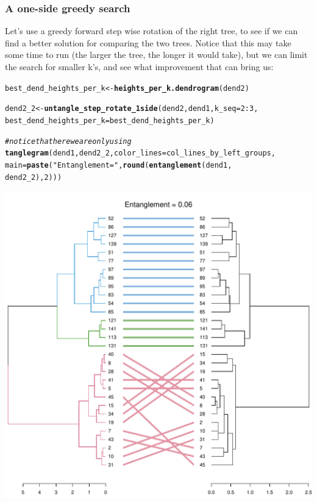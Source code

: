 \documentclass[shortnames,nojss,article]{jss}\usepackage[]{graphicx}\usepackage[]{color}
\makeatletter
\def\maxwidth{ %
  \ifdim\Gin@nat@width>\linewidth
    \linewidth
  \else
    \Gin@nat@width
  \fi
}
\newcommand{\hlnum}[1]{\textcolor[rgb]{0.686,0.059,0.569}{#1}}%
\newcommand{\hlstr}[1]{\textcolor[rgb]{0.192,0.494,0.8}{#1}}%
\newcommand{\hlcom}[1]{\textcolor[rgb]{0.678,0.584,0.686}{\textit{#1}}}%
\newcommand{\hlopt}[1]{\textcolor[rgb]{0,0,0}{#1}}%
\newcommand{\hlstd}[1]{\textcolor[rgb]{0.345,0.345,0.345}{#1}}%
\newcommand{\hlkwb}[1]{\textcolor[rgb]{0.69,0.353,0.396}{#1}}%
\newcommand{\hlkwc}[1]{\textcolor[rgb]{0.333,0.667,0.333}{#1}}%
\newcommand{\hlkwd}[1]{\textcolor[rgb]{0.737,0.353,0.396}{\textbf{#1}}}%
\newenvironment{kframe}{%
 \def\at@end@of@kframe{}%
 \ifinner\ifhmode%
  \def\at@end@of@kframe{\end{minipage}}%
  \begin{minipage}{\columnwidth}%
 \fi\fi%
 \def\FrameCommand##1{\hskip\@totalleftmargin \hskip-\fboxsep
 \colorbox{shadecolor}{##1}\hskip-\fboxsep
     \hskip-\linewidth \hskip-\@totalleftmargin \hskip\columnwidth}%
 \MakeFramed {\advance\hsize-\width
   \@totalleftmargin\z@ \linewidth\hsize
   \@setminipage}}%
 {\par\unskip\endMakeFramed%
 \at@end@of@kframe}
\newenvironment{knitrout}{}{} %
\makeatother
\begin{document}
\subsubsection{A one-side greedy search}

Let's use a greedy forward step wise rotation of the right tree, to see if we can find a better solution for comparing the two trees. Notice that this may take some time to run (the larger the tree, the longer it would take), but we can limit the search for smaller k's, and see what improvement that can bring us:


\begin{knitrout}
\color{fgcolor}\begin{kframe}
\begin{alltt}
\hlstd{best_dend_heights_per_k} \hlkwb{<-} \hlkwd{heights_per_k.dendrogram}\hlstd{(dend2}\hlstd{)}

\hlstd{dend2_2} \hlkwb{<-} \hlkwd{untangle_step_rotate_1side}\hlstd{(dend2, dend1,} \hlkwc{k_seq} \hlstd{=} \hlnum{2}\hlopt{:}\hlnum{3}\hlstd{,}
    \hlkwc{best_dend_heights_per_k} \hlstd{= best_dend_heights_per_k)}
\end{alltt}


{\ttfamily\noindent\itshape\color{messagecolor}{\#\# Loading required package: plyr}}\begin{alltt}
\hlcom{# notice that here we are only using}
\hlkwd{tanglegram}\hlstd{(dend1, dend2_2,} \hlkwc{color_lines} \hlstd{= col_lines_by_left_groups,}
    \hlkwc{main} \hlstd{=} \hlkwd{paste}\hlstd{(}\hlstr{"Entanglement ="}\hlstd{,} \hlkwd{round}\hlstd{(}\hlkwd{entanglement}\hlstd{(dend1,}
        \hlstd{dend2_2),} \hlnum{2}\hlstd{)))}
\end{alltt}
\end{kframe}

{\centering \includegraphics[width=\maxwidth]{figure/unnamed-chunk-36} 

}
\end{knitrout}
\end{document}
